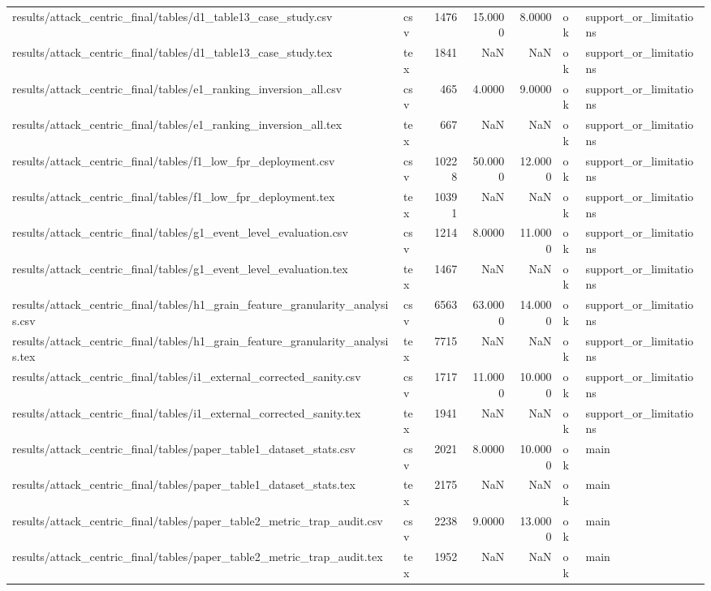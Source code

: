 \begin{tabular}{llrrrll}
results/attack_centric_final/tables/d1_table13_case_study.csv & csv & 1476 & 15.0000 & 8.0000 & ok & support_or_limitations \\
results/attack_centric_final/tables/d1_table13_case_study.tex & tex & 1841 & NaN & NaN & ok & support_or_limitations \\
results/attack_centric_final/tables/e1_ranking_inversion_all.csv & csv & 465 & 4.0000 & 9.0000 & ok & support_or_limitations \\
results/attack_centric_final/tables/e1_ranking_inversion_all.tex & tex & 667 & NaN & NaN & ok & support_or_limitations \\
results/attack_centric_final/tables/f1_low_fpr_deployment.csv & csv & 10228 & 50.0000 & 12.0000 & ok & support_or_limitations \\
results/attack_centric_final/tables/f1_low_fpr_deployment.tex & tex & 10391 & NaN & NaN & ok & support_or_limitations \\
results/attack_centric_final/tables/g1_event_level_evaluation.csv & csv & 1214 & 8.0000 & 11.0000 & ok & support_or_limitations \\
results/attack_centric_final/tables/g1_event_level_evaluation.tex & tex & 1467 & NaN & NaN & ok & support_or_limitations \\
results/attack_centric_final/tables/h1_grain_feature_granularity_analysis.csv & csv & 6563 & 63.0000 & 14.0000 & ok & support_or_limitations \\
results/attack_centric_final/tables/h1_grain_feature_granularity_analysis.tex & tex & 7715 & NaN & NaN & ok & support_or_limitations \\
results/attack_centric_final/tables/i1_external_corrected_sanity.csv & csv & 1717 & 11.0000 & 10.0000 & ok & support_or_limitations \\
results/attack_centric_final/tables/i1_external_corrected_sanity.tex & tex & 1941 & NaN & NaN & ok & support_or_limitations \\
results/attack_centric_final/tables/paper_table1_dataset_stats.csv & csv & 2021 & 8.0000 & 10.0000 & ok & main \\
results/attack_centric_final/tables/paper_table1_dataset_stats.tex & tex & 2175 & NaN & NaN & ok & main \\
results/attack_centric_final/tables/paper_table2_metric_trap_audit.csv & csv & 2238 & 9.0000 & 13.0000 & ok & main \\
results/attack_centric_final/tables/paper_table2_metric_trap_audit.tex & tex & 1952 & NaN & NaN & ok & main \\

\end{tabular}
